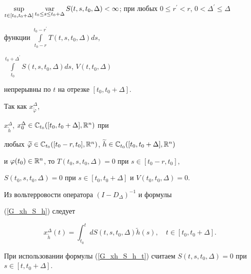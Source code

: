 $\sup\limits_{t\in [t_{0},t_{0}+\Delta] }\Var\limits_{t_{0}\leq


s\leq t_{0}+\Delta}S (t,s,t_{0},\Delta)


<\infty$; при любых $0\leq r^{\prime}<r$, $0<\Delta^{\prime}\leq\Delta$ 


функции $\int\limits_{t_{0}-r}^{t_{0}-r^{\prime}}T (


t,s,t_{0},\Delta) ds$,


$\int\limits_{t_{0}}^{t_{0}+\Delta^{\prime}}S (


t,s,t_{0},\Delta) ds$, $V (t,t_{0},\Delta) $


непрерывны по $t$ на отрезке $ [t_{0},t_{0}+\Delta] $.


Так как $x_{\widetilde{\varphi}}^{\Delta}$,


$x_{\widetilde{h}}^{\Delta}$, $x_{0}^{\Delta}\in \Bbb C_{t_{0}} (


[t_{0},t_{0}+\Delta],\Bbb{R}^{n}) $ при


любых $\widetilde{\varphi}\in \Bbb C_{t_{0}} ([


t_{0}-r,t_{0}],\Bbb{R}^{n}) $, $\widetilde{h}\in


\Bbb C_{t_{0}} ([t_{0},t_{0}+\Delta],\Bbb{R}^{n})$


и $\varphi (t_{0}) \in\Bbb{R}^{n}$, то $T (t_{0}


,s,t_{0},\Delta)=0$ при $s\in [t_{0}-r,t_{0}] $,


$S (t_{0},s,t_{0},\Delta)=0$ при $s\in [t_{0},t_{0}


+\Delta] $ и $V (t_{0},t_{0},\Delta)=0$.





Из вольтерровости оператора $ (I-D_{\Delta}) ^{-1}$ и формулы


(\ref{G_xh_S_h}) следует


\begin{equation}


x_{\widetilde{h}}^{\Delta} (t)=\int_{t_{0}}^{t}dS (


t,s,t_{0},\Delta) \widetilde{h} (s),\quad t\in [


t_{0},t_{0}+\Delta] .\label{G_xh_S_h_t}


\end{equation}


При использовании формулы (\ref{G_xh_S_h_t}) считаем $S (


t,s,t_{0},\Delta)=0$ при $s\in [t,t_{0}+\Delta] $.





